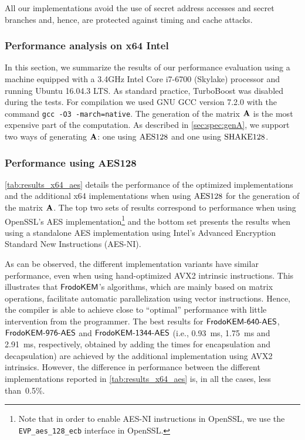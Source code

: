 \documentclass{iacrcc}
\newif\ifshoworiginal
\begin{document}
All our implementations avoid the use of secret address accesses and secret branches and, hence,
are protected against timing and cache attacks.


\subsubsection{Performance analysis on x64 Intel}\label{sec:results_x64}

\ifshoworiginal
In this section, we summarize the results of our performance evaluation using a machine equipped with a 3.4GHz Intel Core i7-6700 (Skylake) processor and running Ubuntu 16.04.3 LTS. As standard practice, TurboBoost was disabled during the tests. For compilation we used GNU GCC version 7.2.0 with the command {\tt gcc -O3 -march=native}. 
The generation of the matrix $\mathbf{A}$ is the most expensive part of the computation. As described in \autoref{sec:spec:genA}, we support two ways of generating $\mathbf{A}$: one using $\textrm{\upshape\mdseries AES128}$ and one using $\textrm{\upshape\mdseries SHAKE}128$.


\subsubsection{Performance using AES128}\label{sec:results_aes}

\autoref{tab:results_x64_aes} details the performance of the optimized implementations and the additional x64 implementations when using $\textrm{\upshape\mdseries AES128}$ for the generation of the matrix $\mathbf{A}$. The top two sets of results correspond to performance when using OpenSSL's AES implementation\footnote{Note that in order to enable AES-NI instructions in OpenSSL, we use the \texttt{EVP\_aes\_128\_ecb} interface in OpenSSL.} and the bottom set presents the results when using a standalone AES implementation using Intel's Advanced Encryption Standard New Instructions (AES-NI).

As can be observed, the different implementation variants have similar performance, even when using hand-optimized AVX2 intrinsic instructions. This illustrates that $\textsf{\upshape\mdseries FrodoKEM}$'s algorithms, which are mainly based on matrix operations, facilitate automatic parallelization using vector instructions. Hence, the compiler is able to achieve close to ``optimal'' performance with little intervention from the programmer.
The best results for $\textsf{\upshape\mdseries FrodoKEM-640-AES}$, $\textsf{\upshape\mdseries FrodoKEM-976-AES}$ and $\textsf{\upshape\mdseries FrodoKEM-1344-AES}$ (i.e., 0.93~ms, 1.75~ms and 2.91~ms, respectively, obtained by adding the times for encapsulation and decapsulation) are achieved by the additional implementation using AVX2 intrinsics. However, the difference in performance between the different implementations reported in \autoref{tab:results_x64_aes} is, in all the cases, less than~0.5\%.
\end{document}

